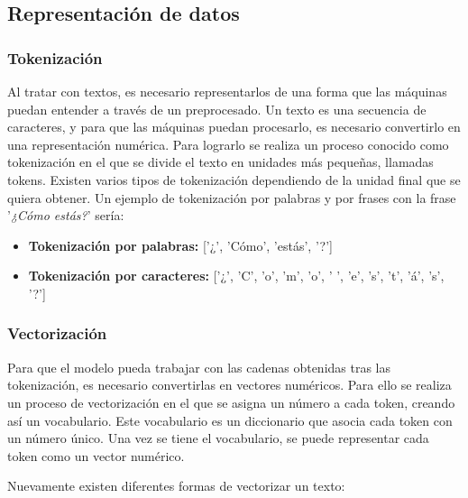 
\subsection{Representación de datos}

\subsubsection{Tokenización}

Al tratar con textos, es necesario representarlos de una forma que las máquinas puedan entender a través de un preprocesado.
Un texto es una secuencia de caracteres, y para que las máquinas puedan procesarlo, es necesario convertirlo en una representación numérica.
Para lograrlo se realiza un proceso conocido como tokenización\cite{medium:tokenization} en el que se divide el texto en unidades más pequeñas, llamadas tokens.
Existen varios tipos de tokenización dependiendo de la unidad final que se quiera obtener. Un ejemplo de tokenización por palabras y por frases con la frase '\textit{¿Cómo estás?}' sería:

\begin{itemize}
	\item \textbf{Tokenización por palabras:} ['¿', 'Cómo', 'estás', '?']
	\item \textbf{Tokenización por caracteres:} ['¿', 'C', 'o', 'm', 'o', ' ', 'e', 's', 't', 'á', 's', '?']
\end{itemize}

\subsubsection{Vectorización}

Para que el modelo pueda trabajar con las cadenas obtenidas tras las tokenización, es necesario convertirlas en vectores numéricos.
Para ello se realiza un proceso de vectorización en el que se asigna un número a cada token, creando así un vocabulario.
Este vocabulario es un diccionario que asocia cada token con un número único.
Una vez se tiene el vocabulario, se puede representar cada token como un vector numérico.

Nuevamente existen diferentes formas de vectorizar\cite{medium:vectorization} un texto:

